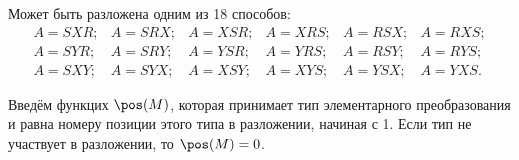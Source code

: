 Может быть разложена одним из 18 способов:
$$\begin{array}{cccccc}
	A = SXR; & A = SRX; & A = XSR; & A = XRS; & A = RSX; & A = RXS; \\
	A = SYR; & A = SRY; & A = YSR; & A = YRS; & A = RSY; & A = RYS; \\
	A = SXY; & A = SYX; & A = XSY; & A = XYS; & A = YSX; & A = YXS.
\end{array}$$


Введём функцих $\pos(M)$, которая принимает тип элементарного преобразования и равна номеру позиции этого типа в разложении, начиная с 1. Если тип не участвует в разложении, то $\pos(M) = 0$.